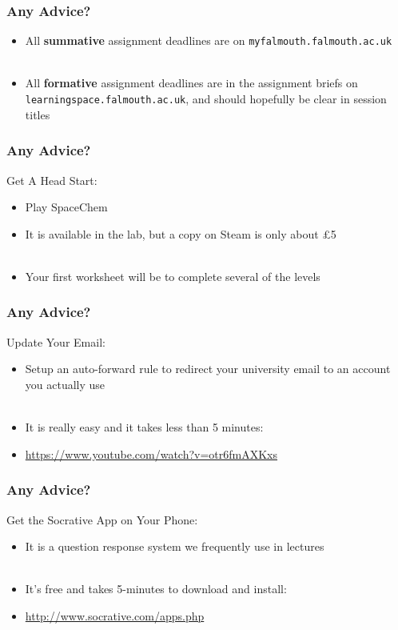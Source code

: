 \begin{frame}
	\frametitle{Any Advice?}	
	
	\begin{itemize}
		\item All \textbf{summative} assignment deadlines are on \texttt{myfalmouth.falmouth.ac.uk}
		\\~\\
		\item All \textbf{formative} assignment deadlines are in the assignment briefs on \texttt{learningspace.falmouth.ac.uk}, and should hopefully be clear in session titles
	\end{itemize}
\end{frame}


\begin{frame}
	\frametitle{Any Advice?}	
	
	Get A Head Start:
	
	\begin{itemize}
		\item Play SpaceChem
		\item It is available in the lab, but a copy on Steam is only about £5
		\\~\\
		\item Your first worksheet will be to complete several of the levels
	\end{itemize}
\end{frame}

\begin{frame}
	\frametitle{Any Advice?}	
	
	Update Your Email:
	
	\begin{itemize}
		\item Setup an auto-forward rule to redirect your university email to an account you actually use
		\\~\\
		\item It is really easy and it takes less than 5 minutes:
		\item \url{https://www.youtube.com/watch?v=otr6fmAXKxs}
	\end{itemize}
\end{frame}

\begin{frame}
	\frametitle{Any Advice?}	
	
	Get the Socrative App on Your Phone:
	
	\begin{itemize}
		\item It is a question response system we frequently use in lectures
		\\~\\
		\item It's free and takes 5-minutes to download and install:
		\item \url{http://www.socrative.com/apps.php}
	\end{itemize}
\end{frame}


